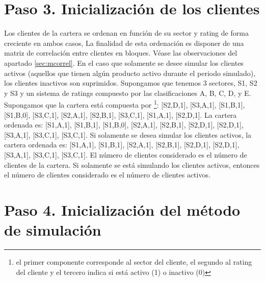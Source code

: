 \section{Paso 3. Inicializaci\'on de los clientes}

Los clientes de la cartera se ordenan en funci\'on de su sector
y rating de forma creciente en ambos casos, La finalidad de esta
ordenaci\'on es disponer de una matriz de correlaci\'on entre
clientes en bloques. V\'ease las observaciones del
apartado \ref{sec:mcorrel}. En el caso que solamente se desee simular los
clientes activos (aquellos que tienen alg\'un producto activo durante el periodo
simulado), los clientes inactivos son suprimidos.
\newline
\newline
Supongamos que tenemos 3 sectores, S1, S2 y S3 y un sistema de
ratings compuesto por las clasificaciones A, B, C, D, y E.
Supongamos que la cartera est\'a compuesta por \footnote{el
primer componente corresponde al sector del cliente, el segundo al
rating del cliente y el tercero indica si est\'a activo (1) o inactivo (0)}:
[S2,D,1], [S3,A,1], [S1,B,1], [S1,B,0], [S3,C,1], [S2,A,1], [S2,B,1], [S3,C,1],
[S1,A,1], [S2,D,1].
\newline
\newline
La cartera ordenada es:
[S1,A,1], [S1,B,1], [S1,B,0], [S2,A,1], [S2,B,1], [S2,D,1], [S2,D,1],
[S3,A,1], [S3,C,1], [S3,C,1].
\newline
\newline
Si solamente se desea simular los clientes activos, la cartera ordenada es:
[S1,A,1], [S1,B,1], [S2,A,1], [S2,B,1], [S2,D,1], [S2,D,1], [S3,A,1],
[S3,C,1], [S3,C,1].
\newline
\newline
El n\'umero de clientes considerado es el n\'umero de clientes de la cartera.
Si solamente se est\'a simulando los clientes activos, entonces el n\'umero
de clientes considerado es el n\'umero de clientes activos.


\section{Paso 4. Inicializaci\'on del m\'etodo de simulaci\'on}

